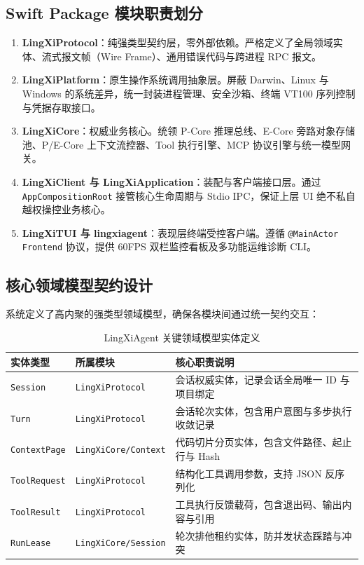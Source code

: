 \documentclass[11pt,a4paper]{article}
\begin{document}
\subsection{Swift Package 模块职责划分}
\begin{enumerate}
    \item \textbf{LingXiProtocol}：纯强类型契约层，零外部依赖。严格定义了全局领域实体、流式报文帧（Wire Frame）、通用错误代码与跨进程 RPC 报文。
    \item \textbf{LingXiPlatform}：原生操作系统调用抽象层。屏蔽 Darwin、Linux 与 Windows 的系统差异，统一封装进程管理、安全沙箱、终端 VT100 序列控制与凭据存取接口。
    \item \textbf{LingXiCore}：权威业务核心。统领 P-Core 推理总线、E-Core 旁路对象存储池、P/E-Core 上下文流控器、Tool 执行引擎、MCP 协议引擎与统一模型网关。
    \item \textbf{LingXiClient 与 LingXiApplication}：装配与客户端接口层。通过 \texttt{AppCompositionRoot} 接管核心生命周期与 Stdio IPC，保证上层 UI 绝不私自越权操控业务核心。
    \item \textbf{LingXiTUI 与 lingxiagent}：表现层终端受控客户端。遵循 \texttt{@MainActor Frontend} 协议，提供 60FPS 双栏监控看板及多功能运维诊断 CLI。
\end{enumerate}

\subsection{核心领域模型契约设计}
系统定义了高内聚的强类型领域模型，确保各模块间通过统一契约交互：
\begin{table}[htbp]
\centering
\small
\begin{tabular}{lll}
\toprule
\textbf{实体类型} & \textbf{所属模块} & \textbf{核心职责说明} \\
\midrule
\texttt{Session} & \texttt{LingXiProtocol} & 会话权威实体，记录会话全局唯一 ID 与项目绑定 \\
\texttt{Turn} & \texttt{LingXiProtocol} & 会话轮次实体，包含用户意图与多步执行收敛记录 \\
\texttt{ContextPage} & \texttt{LingXiCore/Context} & 代码切片分页实体，包含文件路径、起止行与 Hash \\
\texttt{ToolRequest} & \texttt{LingXiProtocol} & 结构化工具调用参数，支持 JSON 反序列化 \\
\texttt{ToolResult} & \texttt{LingXiProtocol} & 工具执行反馈载荷，包含退出码、输出内容与引用 \\
\texttt{RunLease} & \texttt{LingXiCore/Session} & 轮次排他租约实体，防并发状态踩踏与冲突 \\
\bottomrule
\end{tabular}
\caption{LingXiAgent 关键领域模型实体定义}
\end{table}
\end{document}
